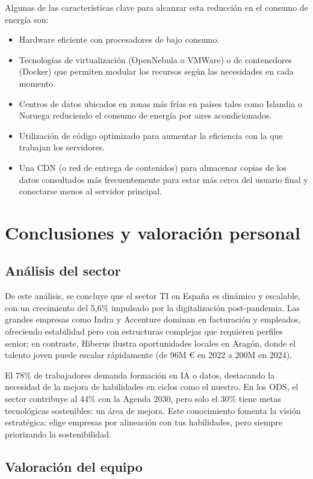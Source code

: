 \documentclass[11.5pt]{article}
\begin{document}
	Algunas de las características clave para alcanzar esta reducción en el consumo de energía son:
	\begin{itemize}
		\item Hardware eficiente con procesadores de bajo consumo.
		\item 	Tecnologías de virtualización (OpenNebula o VMWare) o de contenedores (Docker) que permiten modular los recursos según las necesidades en cada momento.
		\item 	Centros de datos ubicados en zonas más frías en países tales como Islandia o Noruega reduciendo el consumo de energía por aires acondicionados.
		\item 	Utilización de código optimizado para aumentar la eficiencia con la que trabajan los servidores.
		\item 	Una CDN (o red de entrega de contenidos) para almacenar copias de los datos consultados más frecuentemente para estar más cerca del usuario final y conectarse menos al servidor principal.
	\end{itemize}

	
	\section{Conclusiones y valoración personal}
	
	\subsection{Análisis del sector}
	
	De este análisis, se concluye que el sector TI en España es dinámico y escalable, con un crecimiento del
	5,6\% impulsado por la digitalización post-pandemia. Las grandes empresas como Indra y Accenture dominan en facturación y empleados, ofreciendo estabilidad pero con estructuras complejas que requieren perfiles senior; en contraste, Hiberus ilustra oportunidades locales en Aragón, donde el talento joven puede escalar rápidamente (de 96M € en 2022 a 200M en 2024).
	
	El 78\% de trabajadores demanda formación en IA o datos, destacando la necesidad de la mejora de habilidades en ciclos como el nuestro. En los ODS, el sector contribuye al 44\% con la Agenda 2030, pero solo
	el 30\% tiene metas tecnológicas sostenibles: un área de mejora. Este conocimiento fomenta la visión estratégica: elige empresas por alineación con tus habilidades, pero siempre priorizando la sostenibilidad.
	
	\subsection{Valoración del equipo}
	
\end{document}

